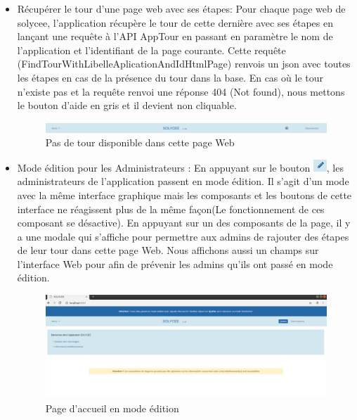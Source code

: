 \documentclass[12pt]{article}
\begin{document}
\begin{itemize}
\item Récupérer le tour d'une page web avec ses étapes: Pour chaque page web de solycee, l'application récupère le tour de cette dernière avec ses étapes en lançant une requête à l'API AppTour en passant en paramètre le nom de l'application et l'identifiant de la page courante. Cette requête (FindTourWithLibelleAplicationAndIdHtmlPage) renvois un json avec toutes les étapes en cas de la présence du tour dans la base. En cas où le tour n'existe pas et la requête renvoi une réponse 404 (Not found), nous mettons le bouton d'aide en gris et il devient non cliquable.

\begin{figure}[H]
	\centering
 		\includegraphics[width=1\textwidth]{diagrammes/aideNonDispo.png}
  		\caption{Pas de tour disponible dans cette page Web }
	\end{figure}


\item Mode édition pour les Administrateurs : En appuyant sur le bouton  \includegraphics[width=5mm,scale=0.5]{diagrammes/Bouton_modeEdition.png}, les administrateurs  de l'application passent en mode édition. Il s'agit d'un mode avec la même interface graphique mais les composants et les boutons de cette interface ne réagissent plus de la même façon(Le fonctionnement de ces composant se désactive). En appuyant sur un des composants de la page, il y a une modale qui s'affiche pour permettre aux admins de rajouter des étapes de leur tour dans cette page Web.  Nous affichons aussi un champs sur l'interface Web pour afin de prévenir les admins qu'ils ont passé en mode édition.

 \begin{figure}[H]
	\centering
 		\includegraphics[width=1\textwidth]{diagrammes/mode_edition.png}
  		\caption{Page d'accueil en mode édition}
	\end{figure}


\end{itemize}
\end{document}
